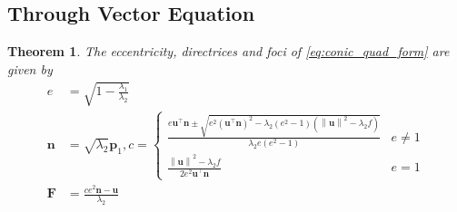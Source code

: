 \documentclass[]{interact}
\theoremstyle{plain}%
\newtheorem{theorem}{Theorem}[section]
\theoremstyle{definition}
\theoremstyle{remark}
\providecommand{\brak}[1]{\ensuremath{\left(#1\right)}}
\providecommand{\norm}[1]{\left\lVert#1\right\rVert}
\let\vec\mathbf
\begin{document}
\subsection{Through Vector Equation}
%
\begin{theorem}
  \label{them:conic_quad_form_encF}
The eccentricity, directrices and foci of \eqref{eq:conic_quad_form} are given by 
\begin{align}
  \label{eq:conic_quad_form_e} 
  e&= \sqrt{1-\frac{\lambda_1}{\lambda_2}}
\\
\label{eq:conic_quad_form_nc} 
  \vec{n}&= \sqrt{\lambda_2}\vec{p}_1,  
  c = 
  \begin{cases}
    \frac{e\vec{u}^{\top}\vec{n} \pm \sqrt{e^2\brak{\vec{u}^{\top}\vec{n}}^2-\lambda_2\brak{e^2-1}\brak{\norm{\vec{u}}^2 - \lambda_2 f}}}{\lambda_2e\brak{e^2-1}} & e \ne 1
    \\
    \frac{\norm{\vec{u}}^2 - \lambda_2 f   }{2e^2\vec{u}^{\top}\vec{n}} & e = 1
  \end{cases}
  \\
  \label{eq:conic_quad_form_F} 
  \vec{F}  &= \frac{ce^2\vec{n}-\vec{u}}{\lambda_2}
\end{align}  

\end{theorem}
\end{document}

